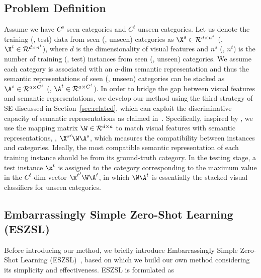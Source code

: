 \documentclass[journal]{IEEEtran}
\begin{document}
\subsection{Problem Definition} \label{sec:prob_def}
Assume we have $C^s$ seen categories and $C^t$ unseen categories. Let us denote the training (\resp, test) data from seen (\resp, unseen) categories as $\X^s\in\mathcal{R}^{d\times n^s}$ (\resp, $\X^t\in\mathcal{R}^{d\times n^t}$), where $d$ is the dimensionality of visual features and $n^s$ (\resp, $n^t$) is the number of training (\resp, test) instances  from seen (\resp, unseen) categories. We assume each category is associated with an $a$-dim semantic representation and thus the semantic representations of seen (\resp, unseen) categories can be stacked as $\A^s\in\mathcal{R}^{a\times C^s}$ (\resp, $\A^t\in\mathcal{R}^{a\times C^t}$). In order to bridge the gap between visual features and semantic representations, we develop our method using the third strategy of SE discussed in Section~\ref{sec:related}, which can exploit the discriminative capacity of semantic representations as claimed in~\cite{romera2015embarrassingly}.
Specifically, inspired by \cite{romera2015embarrassingly,guo2016transductive,qiao2016less}, we use the mapping matrix $\W\in\mathcal{R}^{d\times a}$ to match visual features with semantic representations, \ie, ${\X^s}'\W\A^s$, which measures the compatibility between instances and categories. 
Ideally, the most compatible semantic representation of each training instance should be from its ground-truth category. In the testing stage, a test instance $\x^t$ is assigned to the category corresponding to the maximum value in the $C^t$-dim vector ${\x^t}'\W\A^t$, in which $\W\A^t$ is essentially the stacked visual classifiers for unseen categories. 


\subsection{Embarrassingly Simple Zero-Shot Learning (ESZSL)}
Before introducing our method, we briefly introduce Embarrassingly Simple Zero-Shot Learning (ESZSL)~\cite{romera2015embarrassingly}, based on which we build our own method considering its simplicity and effectiveness. ESZSL is formulated as
\end{document}
